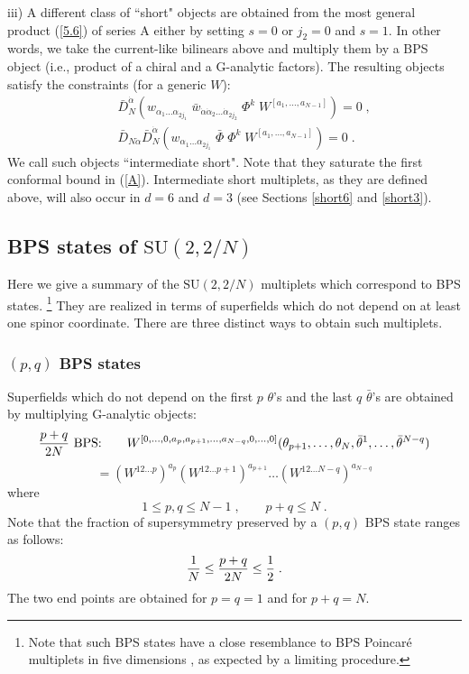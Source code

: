 \documentclass[a4paper,12pt]{article}
\begin{document}
iii) A different class of ``short" objects are obtained from the 
most general product (\ref{5.6}) of series A either by setting 
$s=0$ or $j_2=0$ and $s=1$. In other words, we take  the 
current-like bilinears above and multiply them by a BPS object 
(i.e., product of a chiral and a G-analytic factors). The 
resulting objects satisfy the constraints (for a generic $W$): 
\begin{eqnarray}
  && \bar D^{\dot\alpha}_N(w_{\alpha_1\ldots\alpha_{2j_1}}\;\bar 
w_{\dot\alpha\dot\alpha_2\ldots\dot\alpha_{2j_2}}\; \Phi^k\;  
W^{[a_1,\ldots,a_{N-1}]})=0\;, \label{5.17'}\\ 
  &&\bar D_{N\dot\alpha} \bar 
D_N ^{\dot\alpha}(w_{\alpha_1\ldots\alpha_{2j_1}}\;\bar\Phi\; \Phi^k\;  
W^{[a_1,\ldots,a_{N-1}]})=0\;. 
\label{5.18'} 
\end{eqnarray} 
We call such objects ``intermediate short". Note that they 
saturate the first conformal bound in (\ref{A}). Intermediate 
short multiplets, as they are defined above, will also occur in 
$d=6$ and $d=3$ (see Sections \ref{short6} and \ref{short3}). 
  
 
\subsection{BPS states of $\mbox{SU}(2,2/N)$}

Here we give a summary of the  $\mbox{SU}(2,2/N)$ multiplets which 
correspond to BPS states. \footnote{Note that such BPS states have 
a close resemblance to BPS Poincar\'e multiplets in five 
dimensions \cite{HULL}, as expected by a limiting procedure.} They 
are realized in terms of superfields which do not depend on at 
least one spinor coordinate. There are three distinct ways to 
obtain such multiplets. 

\subsubsection{$(p,q)$ BPS states} 

Superfields which do not depend on the first $p$ $\theta$'s and 
the last $q$ $\bar\theta$'s are obtained by multiplying 
G-analytic objects: 
$$
{p+q\over 2N}\mbox{ BPS:}\qquad 
W^{[0,\ldots,0,a_p,a_{p+1},\ldots,a_{N-q},0,\ldots,0]} 
(\theta_{p+1},\ldots,\theta_{N}, 
\bar\theta^1,\ldots,\bar\theta^{N-q}) 
$$
\begin{equation}\label{5.19}
=(W^{12\ldots p})^{a_p}(W^{12\ldots p+1})^{a_{p+1}}\ldots 
(W^{12\ldots N-q})^{a_{N-q}}   
\end{equation}
where
\begin{equation}\label{5.20}
 1\leq p,q\leq N-1\;, \qquad  p+q\leq N\;.
\end{equation}
Note that the fraction of supersymmetry preserved by a $(p,q)$ BPS 
state ranges as follows: 
\begin{equation}\label{5.21'}
{1\over N} \leq {p+q\over 2N} \leq {1\over 2}\;.
\end{equation}
The two end points are obtained for $p=q=1$ and for $p+q=N$.
\end{document}

